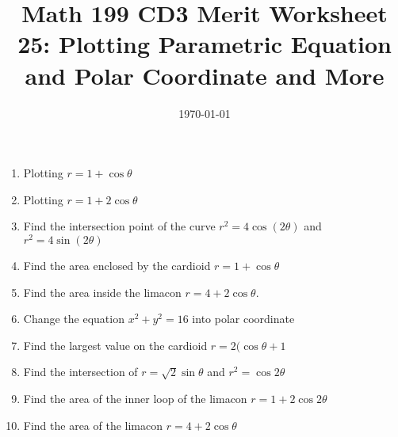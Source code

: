 
\usepackage{fullpage,amsmath,amssymb,amsthm}

\newcommand{\D}{\displaystyle}

\title{Math 199 CD3 Merit Worksheet 25: Plotting Parametric Equation and Polar Coordinate and More}
\date{\today}



\maketitle
\begin{enumerate}
	\item Plotting $r=1+\cos \theta$
	\vfill
	\item Plotting $r=1+2\cos \theta$
	\vfill
	\newpage
	\item Find the intersection point of the curve $r^2=4\cos (2\theta)$ and $r^2=4\sin (2\theta)$
	\vfill

	\item Find the area enclosed by the cardioid $r=1+\cos \theta$
	\vfill
	\item Find the area inside the limacon $r = 4 + 2\cos \theta$.
	\vfill
	\newpage
	\item Change the equation $x^2+y^2=16$ into polar coordinate
	\vfill
	\item Find the largest value on the cardioid $r=2(\cos \theta +1$
	\vfill
	\item Find the intersection of $r=\sqrt2 \sin\theta$ and $r^2=\cos 2\theta$
	\vfill
	\newpage
	\item Find the area of the inner loop of the limacon $r=1+2\cos 2\theta$
	\vfill 
	\item Find the area of the limacon $r=4+2\cos \theta$
	\vfill
\end{enumerate}
